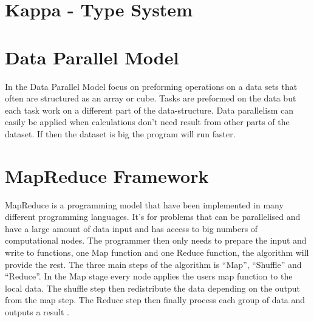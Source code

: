 \section{Kappa - Type System}

\section{Data Parallel Model}
In the Data Parallel Model focus on preforming operations on a data sets that often are structured as an array or cube. Tasks are preformed on the data but each task work on a different part of the data-structure. Data parallelism can easily be applied when calculations don’t need result from other parts of the dataset. If then the dataset is big the program will run faster. 


\section{MapReduce Framework}
MapReduce is a programming model that have been implemented in many different programming languages. It’s for problems that can be parallelised and have a large amount of data input and has access to big numbers of computational nodes. The programmer then only needs to prepare the input and write to functions, one Map function and one Reduce function, the algorithm will provide the rest. The three main steps of the algorithm is “Map”, “Shuffle” and “Reduce”. In the Map stage every node applies the users map function to the local data. The shuffle step then redistribute the data depending on the output from the map step. The Reduce step then finally process each group of data and outputs a result \citep{mapreduce}.
